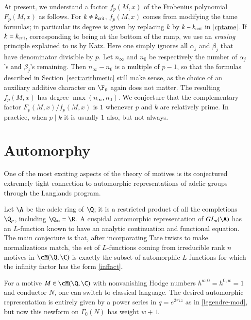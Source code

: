 \documentclass{notices}
\numberwithin{equation}{section}
\numberwithin{table}{section}
\numberwithin{figure}{section}
\begin{document}
{ At present, we understand a factor $f_p(M,x)$ 
of the Frobenius polynomial $F_p(M,x)$ as
follows.  For $k \neq k_{\rm crit}$, $f_p(M,x)$ 
comes from modifying the tame formulas; 
in particular its degree is given by replacing
 $k$ by $k-k_{\rm crit}$ in \eqref{cptame}. 
 If $k=k_{\rm crit}$, corresponding to being
 at the bottom of the ramp, we use an {\em erasing} principle
 explained to us by Katz.  
Here one simply ignores all $\alpha_j$ and
$\beta_j$ that have denominator divisible by $p$.   Let
$n_\infty$ and $n_0$ be respectively the number of 
$\alpha_j$'s and $\beta_j$'s remaining.  Then
$n_\infty-n_0$ is a multiple of $p-1$, so that the formulas 
described in Section~\ref{sect:arithmetic} still make sense, as 
the choice of an auxiliary additive character on $\F_p$
again does not matter.  The resulting $f_p(M,x)$ has
degree $\max(n_\infty,n_0)$.  
We conjecture that the complementary factor 
$F_p(M,x)/f_p(M,x)$ is $1$ whenever $p$ and $k$ are relatively 
prime.  In practice, when $p \mid k$ it is usually $1$ also, but 
not always.  

\section{Automorphy} 
\label{automorphy}  
One of the most exciting aspects of the theory of motives is its conjectured
extremely tight connection to automorphic representations of 
adelic groups through the Langlands program.   

  Let $\A$ be the adele ring of $\Q$; it is a restricted product of all
the completions $\Q_p$, including $\Q_\infty=\R$.  A cuspidal automorphic representation of 
$GL_n(\A)$ has an $L$-function known to have an analytic continuation and functional equation. 
The main conjecture is that,
after incorporating Tate twists to make normalizations match, the set 
of $L$-functions coming from irreducible rank $n$ motives in 
$\cM(\Q,\C)$ is exactly the subset of automorphic $L$-functions for
which the infinity factor has the form \eqref{inffact}.   

  For a motive $M \in \cM(\Q,\C)$ with 
nonvanishing Hodge numbers $h^{w,0}=h^{0,w}=1$ and conductor
$N$, one can switch to classical language.  The desired automorphic 
representation is entirely given by a power series in $q=e^{2 \pi i z}$ as in \eqref{legendre-mod},
but now this newform on $\Gamma_0(N)$ has weight $w+1$.   


}
\end{document}
